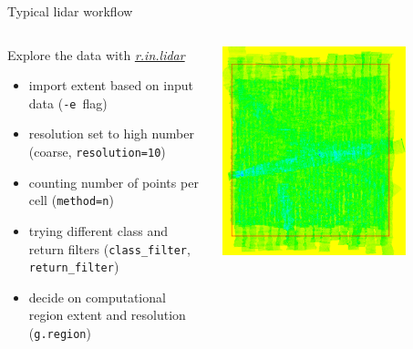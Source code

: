 \documentclass[xcolor={dvipsnames,usenames},beamer,aspectratio=169]{beamer}
\newcommand{\gmodule}[1]{\href{http://grass.osgeo.org/grass71/manuals/#1.html}{\emph{#1}}}
\begin{document}
\begin{frame}{Typical lidar workflow}

\begin{columns}
\begin{column}{0.5\textwidth}

Explore the data with \gmodule{r.in.lidar}
 \begin{itemize}
  \item import extent based on input data (\texttt{-e}~flag)
  \item resolution set to high number (coarse, \texttt{resolution=10})
  \item counting number of points per cell (\texttt{method=n})
  \item trying different class and return filters (\texttt{class\_filter}, \texttt{return\_filter})
  \item decide on computational region extent and resolution (\texttt{g.region})
 \end{itemize}

\end{column}
\begin{column}{0.45\textwidth}

\begin{center}
  \includegraphics[width=0.75\textwidth]{grass/rinlidar_region}


\end{center}
\end{column}
\end{columns}
\end{frame}
\end{document}
